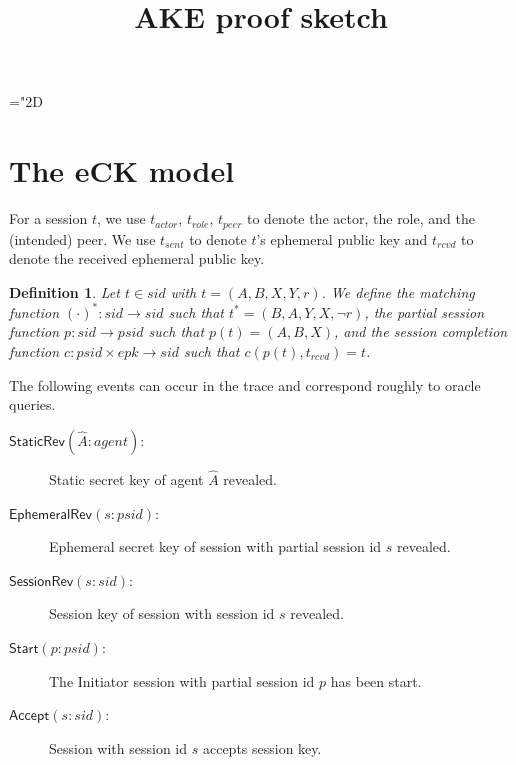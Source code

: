 \documentclass[]{article}
\newtheorem{definition}{Definition}
\begin{document}
\title{AKE proof sketch}
\author{}
\maketitle

\newcommand{\tr}{\mathit{tr}}

\newcommand{\StaticRev}{\mathsf{StaticRev}}
\newcommand{\EphemeralRev}{\mathsf{EphemeralRev}}
\newcommand{\EexpRev}{\mathsf{EexpRev}}
\newcommand{\SessionRev}{\mathsf{SessionRev}}
\newcommand{\Start}{\mathsf{Start}}
\newcommand{\Accept}{\mathsf{Accept}}
\newcommand{\Init}{\mathsf{Init_1}}
\newcommand{\Initt}{\mathsf{Init_2}}
\newcommand{\Resp}{\mathsf{Resp}}

\newcommand{\HasMatching}{\mathsf{HasMatching}}

\newcommand{\psid}{\mathit{psid}}
\newcommand{\sid}{\mathit{sid}}
\newcommand{\agent}{\mathit{agent}}
\newcommand{\epk}{\mathit{epk}}
\newcommand{\esk}{\mathit{esk}}
\newcommand{\eexp}{\mathit{eexp}}

\newcommand{\actor}[1]{#1_{\mathit{actor}}}
\newcommand{\role}[1]{#1_{\mathit{role}}}
\newcommand{\peer}[1]{#1_{\mathit{peer}}}
\newcommand{\sent}[1]{#1_{\mathit{sent}}}
\newcommand{\rcvd}[1]{#1_{\mathit{rcvd}}}
\newcommand{\fresh}{\mathit{fresh}}

\mathchardef\mhyphen="2D

\section{The eCK model}

For a session $t$, we use $\actor{t}$, $\role{t}$, $\peer{t}$ to denote the
  actor, the role, and the (intended) peer.
We use $\sent{t}$ to denote $t$'s ephemeral public key and $\rcvd{t}$ to denote
  the received ephemeral public key.

\begin{definition}
Let $t\in \sid$ with $t=(A,B,X,Y,r)$.
We define the matching function $(\cdot)^{*} : \sid \to \sid$
  such that $t^* = (B,A,Y,X, \neg r)$,
  the partial session function $p : \sid \to \psid$ such that
  $p(t) = (A,B,X)$,
  and the session completion function
  $c : \psid \times \epk \to \sid$ such that $c(p(t), \rcvd{t}) = t$.
\end{definition}

The following events can occur in the trace and correspond roughly to oracle queries.
\begin{description}
\item[$\StaticRev(\hat{A} : \agent)$:] Static secret key of agent $\hat{A}$ revealed.
\item[$\EphemeralRev(s : \psid)$:] Ephemeral secret key of session with partial session
  id $s$ revealed.
\item[$\SessionRev(s : \sid)$:] Session key of session with session id $s$ revealed.
\item[$\Start(p : \psid)$:] The Initiator session with partial session id $p$ has
  been start.
\item[$\Accept(s : \sid)$:] Session with session id $s$ accepts session key.
\end{description}
\end{document}
